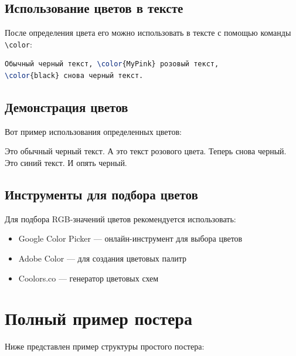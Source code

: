 \documentclass[12pt,a4paper]{article}
\begin{document}
\subsection{Использование цветов в тексте}

После определения цвета его можно использовать в тексте с помощью команды \texttt{\textbackslash color}:

\begin{lstlisting}[language=TeX]
Обычный черный текст, \color{MyPink} розовый текст, 
\color{black} снова черный текст.
\end{lstlisting}

\subsection{Демонстрация цветов}

Вот пример использования определенных цветов:

Это обычный черный текст. \color{MyPink}А это текст розового цвета.\color{black} Теперь снова черный. \color{MyBlue}Это синий текст.\color{black} И опять черный.

\subsection{Инструменты для подбора цветов}

Для подбора RGB-значений цветов рекомендуется использовать:
\begin{itemize}
    \item Google Color Picker — онлайн-инструмент для выбора цветов
    \item Adobe Color — для создания цветовых палитр
    \item Coolors.co — генератор цветовых схем
\end{itemize}

\section{Полный пример постера}

Ниже представлен пример структуры простого постера:
\end{document}
